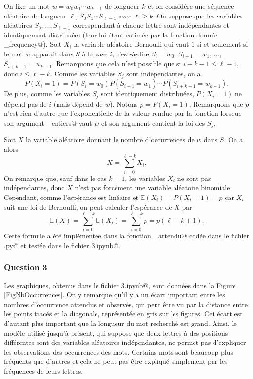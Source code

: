 \documentclass[a4paper,12pt]{article}
\begin{document}
On fixe un mot $w = w_0 w_1 \dotsm w_{k-1}$ de longueur $k$ et on considère une séquence aléatoire de longueur $\ell$, $S_0 S_1 \dotsm S_{\ell - 1}$ avec $\ell \geq k$. On suppose que les variables aléatoires $S_0, \dotsc, S_{\ell-1}$ correspondant à chaque lettre sont indépendantes et identiquement distribuées (leur loi étant estimée par la fonction donnée \verb@nucleotide_frequency@). Soit $X_i$ la variable aléatoire Bernoulli qui vaut $1$ si et seulement si le mot $w$ apparait dans $S$ à la case $i$, c'est-à-dire $S_i = w_0$, $S_{i+1} = w_1$, $\dotsc$, $S_{i + k - 1} = w_{k-1}$. Remarquons que cela n'est possible que si $i + k - 1 \leq \ell - 1$, donc $i \leq \ell - k$. Comme les variables $S_j$ sont indépendantes, on a
\[
P(X_i = 1) = P(S_i = w_0) P(S_{i+1} = w_1) \dotsm P(S_{i+k-1} = w_{k-1}).
\]
De plus, comme les variables $S_j$ sont identiquement distribuées, $P(X_i = 1)$ ne dépend pas de $i$ (mais dépend de $w$). Notons $p = P(X_i = 1)$. Remarquons que $p$ n'est rien d'autre que l'exponentielle de la valeur rendue par la fonction \verb@logproba@ lorsque son argument \verb@liste_entiers@ vaut $w$ et son argument \verb@m@ contient la loi des $S_j$.

Soit $X$ la variable aléatoire donnant le nombre d'occurrences de $w$ dans $S$. On a alors
\[
X = \sum_{i=0}^{\ell - k} X_i.
\]
On remarque que, sauf dans le cas $k = 1$, les variables $X_i$ ne sont pas indépendantes, donc $X$ n'est pas forcément une variable aléatoire binomiale. Cependant, comme l'espérance est linéaire et $\mathbb E(X_i) = P(X_i = 1) = p$ car $X_i$ suit une loi de Bernoulli, on peut calculer l'espérance de $X$ par
\[
\mathbb E(X) = \sum_{i=0}^{\ell - k} \mathbb E(X_i) = \sum_{i=0}^{\ell - k} p = p (\ell - k + 1).
\]
Cette formule a été implémentée dans la fonction \verb@comptage_attendu@ codée dans le fichier \verb@projet.py@ et testée dans le fichier \verb@Projet3.ipynb@.

\subsubsection*{Question 3}

Les graphiques, obtenus dans le fichier \verb@Projet3.ipynb@, sont données dans la Figure \ref{FigNbOccurrences}. On y remarque qu'il y a un écart important entre les nombres d'occurrence attendus et observés, qui peut être vu par la distance entre les points tracés et la diagonale, représentée en gris sur les figures. Cet écart est d'autant plus important que la longueur du mot recherché est grand. Ainsi, le modèle utilisé jusqu'à présent, qui suppose que deux lettres à des positions différentes sont des variables aléatoires indépendantes, ne permet pas d'expliquer les observations des occurrences des mots. Certains mots sont beaucoup plus fréquents que d'autres et cela ne peut pas être expliqué simplement par les fréquences de leurs lettres.
\end{document}
